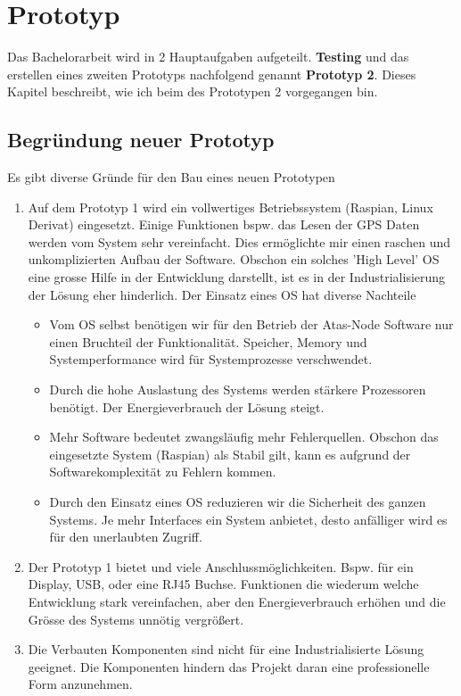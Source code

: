 \documentclass[11pt,english,german]{report}
\theoremstyle{definition}
\begin{document}
\chapter{Prototyp}
Das Bachelorarbeit wird in 2 Hauptaufgaben aufgeteilt.\textbf{ Testing} und das erstellen eines zweiten Prototyps nachfolgend genannt \textbf{Prototyp 2}. Dieses Kapitel beschreibt, wie ich beim des Prototypen 2 vorgegangen bin.

\section{Begründung neuer Prototyp}
Es gibt diverse Gründe für den Bau eines neuen Prototypen
\begin{enumerate}
	\item Auf dem Prototyp 1 wird ein vollwertiges Betriebssystem (Raspian, Linux Derivat) eingesetzt. Einige Funktionen bspw. das Lesen der GPS Daten werden vom System sehr vereinfacht. Dies ermöglichte mir einen raschen und unkomplizierten Aufbau der Software. Obschon ein solches 'High Level' OS eine grosse Hilfe in der Entwicklung darstellt, ist es in der Industrialisierung der Lösung eher hinderlich. Der Einsatz eines OS hat diverse Nachteile
	\begin{itemize}
		\item Vom OS selbst benötigen wir für den Betrieb der Atas-Node Software nur einen Bruchteil der Funktionalität. Speicher, Memory und Systemperformance wird für Systemprozesse verschwendet. 
		\item Durch die hohe Auslastung des Systems werden stärkere Prozessoren benötigt. Der Energieverbrauch der Lösung steigt.
		\item Mehr Software bedeutet zwangsläufig mehr Fehlerquellen. Obschon das eingesetzte System (Raspian) als Stabil gilt, kann es aufgrund der Softwarekomplexität zu Fehlern kommen.
		\item Durch den Einsatz eines OS reduzieren wir die Sicherheit des ganzen Systems. Je mehr Interfaces ein System anbietet, desto anfälliger wird es für den unerlaubten Zugriff.
	\end{itemize}
	\item Der Prototyp 1 bietet und viele Anschlussmöglichkeiten. Bspw. für ein Display, USB, oder eine RJ45 Buchse. Funktionen die wiederum welche Entwicklung stark vereinfachen, aber den Energieverbrauch erhöhen und die Grösse des Systems unnötig vergrößert. 
	\item Die Verbauten Komponenten sind nicht für eine Industrialisierte Lösung geeignet. Die Komponenten hindern das Projekt daran eine professionelle Form anzunehmen.
\end{enumerate}
\end{document}
